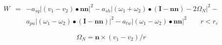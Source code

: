 \documentclass[12pt]{article}
\begin{document}
\begin{eqnarray*}
   W & = & - a_{sq} | (v_1 - v_2) \bullet \mathbf{nn} |^2 - 
   a_{sh} | (\omega_1 + \omega_2) \bullet 
   (\mathbf{I} - \mathbf{nn}) - 2 \Omega_N |^2 - \\
   & & a_{pu} | (\omega_1 - \omega_2) \bullet (\mathbf{I} - \mathbf{nn}) |^2 -
   a_{tw} | (\omega_1 - \omega_2) \bullet \mathbf{nn} |^2  \qquad r < r_c
\end{eqnarray*}

$$
\Omega_N = \mathbf{n} \times (v_1 - v_2) / r
$$
\end{document}
